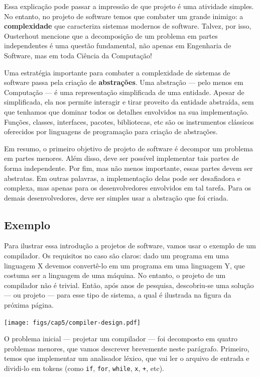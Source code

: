 \documentclass[
  11pt,
  twoside]{book}
\newcommand{\passthrough}[1]{#1}
\let\origfigure\figure
\let\endorigfigure\endfigure
\renewenvironment{figure}[1][2] {
    \expandafter\origfigure\expandafter[!h]
} {
    \endorigfigure
}
\begin{document}
Essa explicação pode passar a impressão de que projeto é uma atividade
simples. No entanto, no projeto de software temos que combater um grande
inimigo: a \textbf{complexidade} que caracteriza sistemas modernos de
software. Talvez, por isso, Ousterhout mencione que a decomposição de um
problema em partes independentes é uma questão fundamental, não apenas
em Engenharia de Software, mas em toda Ciência da Computação!

 Uma estratégia importante para combater a complexidade
de sistemas de software passa pela criação de \textbf{abstrações}. Uma
abstração --- pelo menos em Computação --- é uma representação
simplificada de uma entidade. Apesar de simplificada, ela nos permite
interagir e tirar proveito da entidade abstraída, sem que tenhamos que
dominar todos os detalhes envolvidos na sua implementação. Funções,
classes, interfaces, pacotes, bibliotecas, etc são os instrumentos
clássicos oferecidos por linguagens de programação para criação de
abstrações.

Em resumo, o primeiro objetivo de projeto de software é decompor um
problema em partes menores. Além disso, deve ser possível implementar
tais partes de forma independente. Por fim, mas não menos importante,
essas partes devem ser abstratas. Em outras palavras, a implementação
delas pode ser desafiadora e complexa, mas apenas para os
desenvolvedores envolvidos em tal tarefa. Para os demais
desenvolvedores, deve ser simples usar a abstração que foi criada.

\hypertarget{exemplo}{%
\subsection{Exemplo}\label{exemplo}}

Para ilustrar essa introdução a projetos de software, vamos usar o
exemplo de um compilador. Os requisitos no caso são claros: dado um
programa em uma linguagem X devemos convertê-lo em um programa em uma
linguagem Y, que costuma ser a linguagem de uma máquina. No entanto, o
projeto de um compilador não é trivial. Então, após anos de pesquisa,
descobriu-se uma solução --- ou projeto --- para esse tipo de sistema, a
qual é ilustrada na figura da próxima página.

\begin{figure}
\centering
\texttt{[image: figs/cap5/compiler-design.pdf]}
\caption{Principais módulos de um compilador}
\end{figure}

O problema inicial --- projetar um compilador --- foi decomposto em
quatro problemas menores, que vamos descrever brevemente neste
parágrafo. Primeiro, temos que implementar um analisador léxico, que vai
ler o arquivo de entrada e dividi-lo em tokens (como
\passthrough{\lstinline!if!}, \passthrough{\lstinline!for!},
\passthrough{\lstinline!while!}, \passthrough{\lstinline!x!},
\passthrough{\lstinline!+!}, etc).
\end{document}
